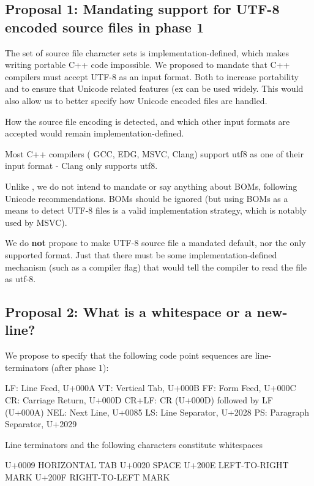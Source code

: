\documentclass{wg21}
\begin{document}
\subsection{Proposal 1: Mandating support for UTF-8 encoded source files in phase 1}

The set of source file character sets is implementation-defined, which makes writing portable C++ code impossible.
We proposed to mandate that C++ compilers must accept UTF-8 as an input format. Both to increase portability and
to ensure that Unicode related features (ex  can be used widely.
This would also allow us to better specify how Unicode encoded files are handled.

How the source file encoding is detected, and which other input formats are accepted would remain implementation-defined.

Most C++ compilers ( GCC, EDG, MSVC, Clang) support utf8 as one of their input format - Clang only supports utf8.

Unlike , we do not intend to mandate or say anything about BOMs, following Unicode recommendations.
BOMs should be ignored (but using BOMs as a means to detect UTF-8 files is a valid implementation strategy, which is notably used by MSVC).

We do \textbf{not} propose to make UTF-8 source file a mandated default, nor the only supported format. Just that there must be
some implementation-defined mechanism (such as a compiler flag) that would tell the compiler to read the file as utf-8.


\subsection{Proposal 2: What is a whitespace or a new-line?}

We propose to specify that the following code point sequences are line-terminators (after phase 1):

\begin{codeblock}
LF:    Line Feed, U+000A
VT:    Vertical Tab, U+000B
FF:    Form Feed, U+000C
CR:    Carriage Return, U+000D
CR+LF: CR (U+000D) followed by LF (U+000A)
NEL:   Next Line, U+0085
LS:    Line Separator, U+2028
PS:    Paragraph Separator, U+2029
\end{codeblock}

Line terminators and the following characters constitute whitespaces

\begin{codeblock}
U+0009 HORIZONTAL TAB
U+0020 SPACE
U+200E LEFT-TO-RIGHT MARK
U+200F RIGHT-TO-LEFT MARK 
\end{codeblock} 
\end{document}
